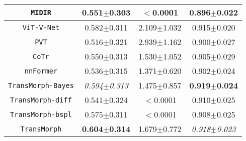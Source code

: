 \documentclass[times,twocolumn,final]{elsarticle}
\begin{document}
\begin{table*}[!t]
{\begin{tabular}{ c | c | c | c }
 \texttt{MIDIR} & 0.551$\pm$0.303 & $<$0.0001 & 0.896$\pm$0.022\\\hline
 \texttt{ViT-V-Net} & 0.582$\pm$0.311 & 2.109$\pm$1.032 & 0.915$\pm$0.020\\
 \hline
 \texttt{PVT} & 0.516$\pm$0.321 & 2.939$\pm$1.162 & 0.900$\pm$0.027\\
 \hline
 \texttt{CoTr} & 0.550$\pm$0.313 & 1.530$\pm$1.052 & 0.905$\pm$0.029\\\hline
 \texttt{nnFormer} & 0.536$\pm$0.315 & 1.371$\pm$0.620 & 0.902$\pm$0.024\\
 \hline
 \hline
 \texttt{TransMorph-Bayes} & \textit{0.594$\pm$0.313} & 1.475$\pm$0.857 & \textbf{0.919}$\pm$\textbf{0.024}\\
 \hline
 \texttt{TransMorph-diff} & 0.541$\pm$0.324 & $<$0.0001 &0.910$\pm$0.025\\
 \hline
 \texttt{TransMorph-bspl} & 0.575$\pm$0.311 & $<$0.0001 & 0.908$\pm$0.025\\
 \hline
 \texttt{TransMorph} & \textbf{0.604$\pm$0.314} & 1.679$\pm$0.772 & \textit{0.918}$\pm$\textit{0.023}\\\hline
\end{tabular}}
\end{table*}
\end{document}
